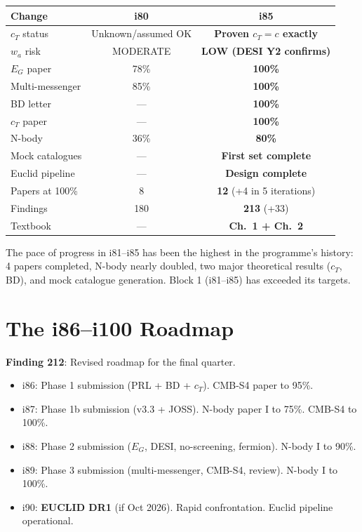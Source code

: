 \documentclass[11pt,a4paper]{article}
\begin{document}
\begin{center}
\begin{tabular}{lcc}
\toprule
\textbf{Change} & \textbf{i80} & \textbf{i85} \\
\midrule
$c_T$ status & Unknown/assumed OK & \textbf{Proven $c_T = c$ exactly} \\
$w_a$ risk & MODERATE & \textbf{LOW (DESI Y2 confirms)} \\
$E_G$ paper & 78\% & \textbf{100\%} \\
Multi-messenger & 85\% & \textbf{100\%} \\
BD letter & --- & \textbf{100\%} \\
$c_T$ paper & --- & \textbf{100\%} \\
N-body & 36\% & \textbf{80\%} \\
Mock catalogues & --- & \textbf{First set complete} \\
Euclid pipeline & --- & \textbf{Design complete} \\
Papers at 100\% & 8 & \textbf{12} (+4 in 5 iterations) \\
Findings & 180 & \textbf{213} (+33) \\
Textbook & --- & \textbf{Ch.\ 1 + Ch.\ 2} \\
\bottomrule
\end{tabular}
\end{center}

The pace of progress in i81--i85 has been the highest in the programme's history: 4 papers completed, N-body nearly doubled, two major theoretical results ($c_T$, BD), and mock catalogue generation. Block 1 (i81--i85) has exceeded its targets.

\section{The i86--i100 Roadmap}

\textbf{Finding 212}: Revised roadmap for the final quarter.

\begin{tcolorbox}[colback=blue!5!white, colframe=dfdblue, title=\textbf{Block 2: Paper Completion \& Submission (i86--i90)}]
\begin{itemize}[nosep]
\item i86: Phase 1 submission (PRL + BD + $c_T$). CMB-S4 paper to 95\%.
\item i87: Phase 1b submission (v3.3 + JOSS). N-body paper I to 75\%. CMB-S4 to 100\%.
\item i88: Phase 2 submission ($E_G$, DESI, no-screening, fermion). N-body I to 90\%.
\item i89: Phase 3 submission (multi-messenger, CMB-S4, review). N-body I to 100\%.
\item i90: \textbf{EUCLID DR1} (if Oct 2026). Rapid confrontation. Euclid pipeline operational.
\end{itemize}
\end{tcolorbox}
\end{document}
